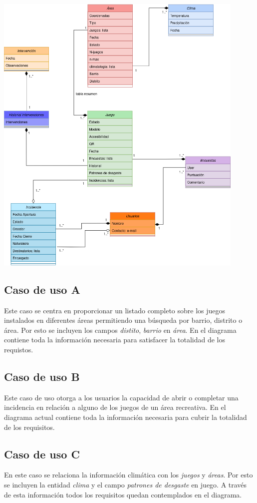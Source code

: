\documentclass[]{article}
\begin{document}
\includegraphics[width=0.9\textwidth]{diagrama_arqui-noaggregados.png}

\subsection{Caso de uso A}
\label{subsec:casoA}
Este caso se centra en proporcionar un listado completo sobre los juegos instalados en diferentes áreas permitiendo una búsqueda por barrio, distrito o área. Por esto se incluyen los campos \textit{distito}, \textit{barrio} en \textit{área}. En el diagrama contiene toda la información necesaria para satisfacer la totalidad de los requistos.

\subsection{Caso de uso B}
\label{subsec:casoB}
Este caso de uso otorga a los usuarios la capacidad de abrir o completar una incidencia en relación a alguno de los juegos de un área recreativa. En el diagrama actual contiene toda la información necesaria para cubrir la totalidad de los requisitos.

\subsection{Caso de uso C}
\label{subsec:casoC}
En este caso se relaciona la información climática con los \textit{juegos} y \textit{áreas}. Por esto se incluyen la entidad \textit{clima} y el campo \textit{patrones de desgaste} en juego. A través de esta información todos los requisitos quedan contemplados en el diagrama.
\end{document}
